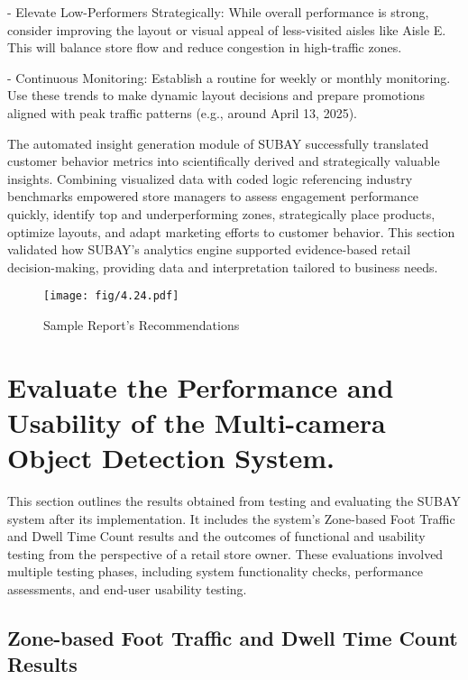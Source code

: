 {\noindent - Elevate Low-Performers Strategically: While overall performance is strong, consider improving the layout or visual appeal of less-visited aisles like Aisle E. This will balance store flow and reduce congestion in high-traffic zones.

\noindent - Continuous Monitoring: Establish a routine for weekly or monthly monitoring. Use these trends to make dynamic layout decisions and prepare promotions aligned with peak traffic patterns (e.g., around April 13, 2025).

The automated insight generation module of SUBAY successfully translated customer behavior metrics into scientifically derived and strategically valuable insights. Combining visualized data with coded logic referencing industry benchmarks empowered store managers to assess engagement performance quickly, identify top and underperforming zones, strategically place products, optimize layouts, and adapt marketing efforts to customer behavior. This section validated how SUBAY’s analytics engine supported evidence-based retail decision-making, providing data and interpretation tailored to business needs.

\begin{figure}[H]
	\caption[Sample Report’s Recommendations]{\newline \newline Sample Report’s Recommendations}
	\centering
	\texttt{[image: fig/4.24.pdf]}
	\label{fig:4.24}
\end{figure}

\section{Evaluate the Performance and Usability of the Multi-camera Object Detection System.}
This section outlines the results obtained from testing and evaluating the SUBAY system after its implementation. It includes the system's Zone-based Foot Traffic and Dwell Time Count results and the outcomes of functional and usability testing from the perspective of a retail store owner. These evaluations involved multiple testing phases, including system functionality checks, performance assessments, and end-user usability testing.

\subsection{Zone-based Foot Traffic and Dwell Time Count Results}

}
